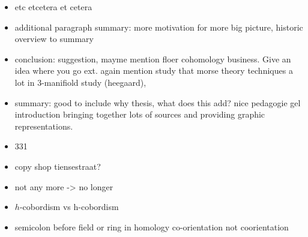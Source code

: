 \begin{itemize}
        \item etc etcetera et cetera
        \item additional paragraph summary: more motivation for more big picture, historic overview  to summary
        \item conclusion: suggestion, mayme mention floer cohomology business. Give an idea where you go ext.  again mention study that morse theory techniques a lot in 3-manifiold study (heegaard), 
        \item summary: good to include  why thesis, what does this add? nice pedagogie gel introduction bringing together lots of sources and providing graphic representations.
        \item 331
        \item copy shop tiensestraat?
        \item not any more -> no longer
        \item $h$-cobordism vs h-cobordism
        \item semicolon before field or ring in homology
        \itme co-orientation not coorientation
\end{itemize}
